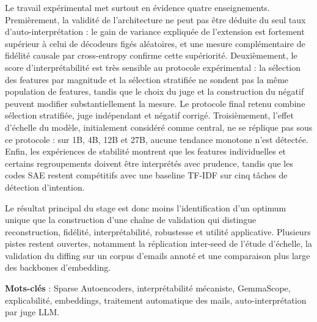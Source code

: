 \documentclass[11pt]{article}
\begin{document}
Le travail expérimental met surtout en évidence quatre enseignements. Premièrement,
la validité de l'architecture ne peut pas être déduite du seul taux d'auto-interprétation :
le gain de variance expliquée de l'extension est fortement supérieur à celui de
décodeurs figés aléatoires, et une mesure complémentaire de fidélité causale par
cross-entropy confirme cette supériorité. Deuxièmement, le score d'interprétabilité est
très sensible au protocole expérimental : la sélection des features par magnitude et
la sélection stratifiée ne sondent pas la même population de features, tandis que le
choix du juge et la construction du négatif peuvent modifier substantiellement la
mesure. Le protocole final retenu combine sélection stratifiée, juge indépendant et
négatif corrigé. Troisièmement, l'effet d'échelle du modèle, initialement considéré
comme central, ne se réplique pas sous ce protocole : sur 1B, 4B, 12B et 27B, aucune
tendance monotone n'est détectée. Enfin, les expériences de stabilité montrent que les
features individuelles et certains regroupements doivent être interprétés avec
prudence, tandis que les codes SAE restent compétitifs avec une baseline TF-IDF sur
cinq tâches de détection d'intention.

Le résultat principal du stage est donc moins l'identification d'un optimum unique que
la construction d'une chaîne de validation qui distingue reconstruction, fidélité,
interprétabilité, robustesse et utilité applicative. Plusieurs pistes restent ouvertes,
notamment la réplication inter-seed de l'étude d'échelle, la validation du diffing sur
un corpus d'emails annoté et une comparaison plus large des backbones d'embedding.

\textbf{Mots-clés} : Sparse Autoencoders, interprétabilité mécaniste, GemmaScope,
explicabilité, embeddings, traitement automatique des mails, auto-interprétation par
juge LLM.

\newpage
\tableofcontents
\newpage
\listoffigures
\listoftables
\newpage
\end{document}

